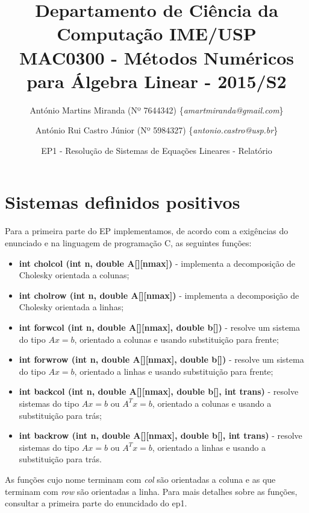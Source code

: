 \documentclass[a4paper,11pt]{article}
\begin{document}
\lstset{language=C}
\small{
\title{
{\small 
Departamento de Ciência da Computação \hfill IME/USP}\\\vspace{0.1in}
MAC0300 - Métodos Numéricos para Álgebra Linear - 2015/S2
}
\vspace{-0.6in} 
\author{
  António Martins Miranda (Nº 7644342) \{\textit{amartmiranda@gmail.com}\} \\
  \and 
  António Rui Castro Júnior (Nº 5984327) \{\textit{antonio.castro@usp.br}\}
  \vspace{-0.6in} 
}
\date{EP1 - Resolução de Sistemas de Equações Lineares - Relatório}
\maketitle
}
\vspace {-0.3in}
\thispagestyle{empty}  

\setlength{\parindent}{5ex}

\section{Sistemas definidos positivos}

Para a primeira parte do EP implementamos, de acordo com a exigências do enunciado e na linguagem de programação C, as seguintes funções: 
\begin{itemize}
	\item {\bf int cholcol (int n, double A[][nmax])} - implementa a decomposição de Cholesky orientada a colunas;
	\item {\bf int cholrow (int n, double A[][nmax])} - implementa a decomposição de Cholesky orientada a linhas;	
	\item {\bf int forwcol (int n, double A[][nmax], double b[])} - resolve um sistema do tipo $Ax=b$, orientado a colunas e usando substituição para frente;
	\item {\bf int forwrow (int n, double A[][nmax], double b[])} - resolve um sistema do tipo $Ax=b$, orientado a linhas e usando substituição para frente;
	\item {\bf int backcol (int n, double A[][nmax], double b[], int trans)} - resolve sistemas do tipo $Ax=b$ ou $A^{T}x=b$, orientado a colunas e usando a substituição para trás;
	\item {\bf int backrow (int n, double A[][nmax], double b[], int trans)} - resolve sistemas do tipo $Ax=b$ ou $A^{T}x=b$, orientado a linhas e usando a substituição para trás.
\end{itemize}
As funções cujo nome terminam com {\it col} são orientadas a coluna e as que terminam com {\it row} são orientadas a linha. Para mais detalhes sobre as funções, consultar a primeira parte do enuncidado do ep1.
\end{document}
